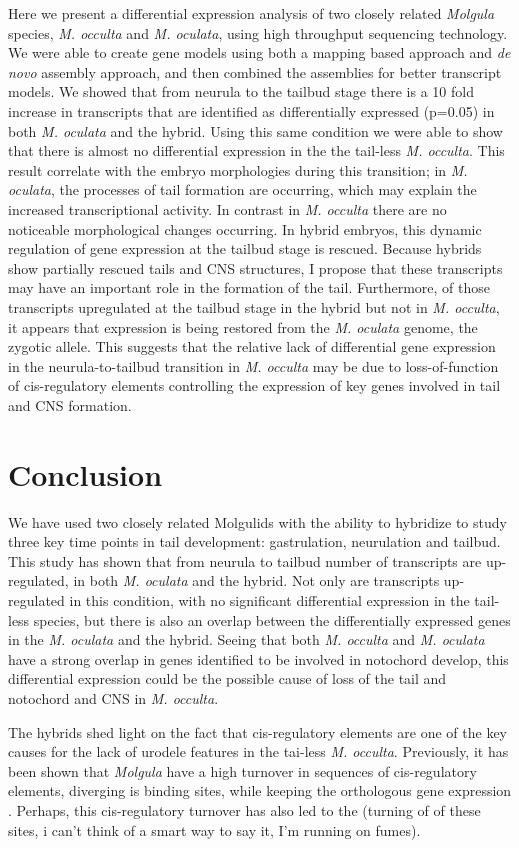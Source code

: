 Here we present a differential expression analysis of two closely related \textit{Molgula} species, \textit{M. occulta} and \textit{M. oculata}, using high throughput sequencing technology. We were able to create gene models using both a mapping based approach and \textit{de novo} assembly approach, and then combined the assemblies for better transcript models. We showed that from neurula to the tailbud stage there is a 10 fold increase in transcripts that are identified as differentially expressed (p=0.05) in both \textit{M. oculata} and the hybrid. Using this same condition we were able to show that there is almost no differential expression in the the tail-less \textit{M. occulta}. This result  correlate with the embryo morphologies during this transition; in \textit{M. oculata}, the processes of tail formation are occurring, which may explain the increased transcriptional activity. In contrast in \textit{M. occulta} there are no noticeable morphological changes occurring. In hybrid embryos, this dynamic regulation of gene expression at the tailbud stage is rescued. Because hybrids show partially rescued tails and CNS structures, I propose that these transcripts may have an important role in the formation of the tail. Furthermore, of those transcripts upregulated at the tailbud stage in the hybrid but not in \textit{M. occulta}, it appears that expression is being restored from the \textit{M. oculata} genome, the zygotic allele. This suggests that the relative lack of differential gene expression in the neurula-to-tailbud transition in \textit{M. occulta} may be due to loss-of-function of cis-regulatory elements controlling the expression of key genes involved in tail and CNS formation. 

\section{Conclusion}

We have used two closely related Molgulids with the ability to hybridize to study three key time points in tail development: gastrulation, neurulation and tailbud. This study has shown that from neurula to tailbud number of transcripts are up-regulated, in both \textit{M. oculata} and the hybrid. Not only are transcripts up-regulated in this condition, with no significant differential expression in the tail-less species, but there is also an overlap between the differentially expressed genes in the \textit{M. oculata} and the hybrid. Seeing that both \textit{M. occulta} and \textit{M. oculata} have a strong overlap in genes identified to be involved in notochord develop, this differential expression could be the possible cause of loss of the tail and notochord and CNS in \textit{M. occulta}. 

The hybrids shed light on the fact that cis-regulatory elements are one of the key causes for the lack of urodele features in the tai-less \textit{M. occulta}. Previously, it has been shown that \textit{Molgula} have a high turnover in sequences of cis-regulatory elements, diverging is binding sites, while keeping the orthologous gene expression \cite{stolfi_divergent_2014}. Perhaps, this cis-regulatory turnover has also led to the (turning of of these sites, i can't think of a smart way to say it, I'm running on fumes). 
